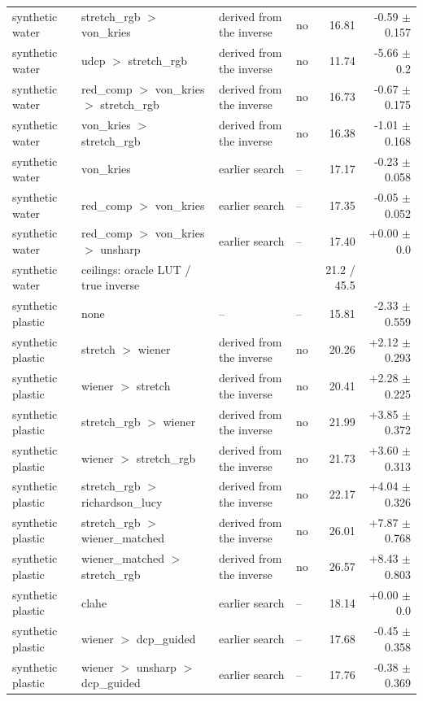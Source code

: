 \begin{tabular}{llllrr}
synthetic water & stretch\_rgb $>$ von\_kries & derived from the inverse & no & 16.81 & -0.59 $\pm$ 0.157 \\
synthetic water & udcp $>$ stretch\_rgb & derived from the inverse & no & 11.74 & -5.66 $\pm$ 0.2 \\
synthetic water & red\_comp $>$ von\_kries $>$ stretch\_rgb & derived from the inverse & no & 16.73 & -0.67 $\pm$ 0.175 \\
synthetic water & von\_kries $>$ stretch\_rgb & derived from the inverse & no & 16.38 & -1.01 $\pm$ 0.168 \\
synthetic water & von\_kries & earlier search & -- & 17.17 & -0.23 $\pm$ 0.058 \\
synthetic water & red\_comp $>$ von\_kries & earlier search & -- & 17.35 & -0.05 $\pm$ 0.052 \\
synthetic water & red\_comp $>$ von\_kries $>$ unsharp & earlier search & -- & 17.40 & +0.00 $\pm$ 0.0 \\
synthetic water & ceilings: oracle LUT / true inverse &  &  & 21.2 / 45.5 &  \\
synthetic plastic & none & -- & -- & 15.81 & -2.33 $\pm$ 0.559 \\
synthetic plastic & stretch $>$ wiener & derived from the inverse & no & 20.26 & +2.12 $\pm$ 0.293 \\
synthetic plastic & wiener $>$ stretch & derived from the inverse & no & 20.41 & +2.28 $\pm$ 0.225 \\
synthetic plastic & stretch\_rgb $>$ wiener & derived from the inverse & no & 21.99 & +3.85 $\pm$ 0.372 \\
synthetic plastic & wiener $>$ stretch\_rgb & derived from the inverse & no & 21.73 & +3.60 $\pm$ 0.313 \\
synthetic plastic & stretch\_rgb $>$ richardson\_lucy & derived from the inverse & no & 22.17 & +4.04 $\pm$ 0.326 \\
synthetic plastic & stretch\_rgb $>$ wiener\_matched & derived from the inverse & no & 26.01 & +7.87 $\pm$ 0.768 \\
synthetic plastic & wiener\_matched $>$ stretch\_rgb & derived from the inverse & no & 26.57 & +8.43 $\pm$ 0.803 \\
synthetic plastic & clahe & earlier search & -- & 18.14 & +0.00 $\pm$ 0.0 \\
synthetic plastic & wiener $>$ dcp\_guided & earlier search & -- & 17.68 & -0.45 $\pm$ 0.358 \\
synthetic plastic & wiener $>$ unsharp $>$ dcp\_guided & earlier search & -- & 17.76 & -0.38 $\pm$ 0.369 \\

\end{tabular}
